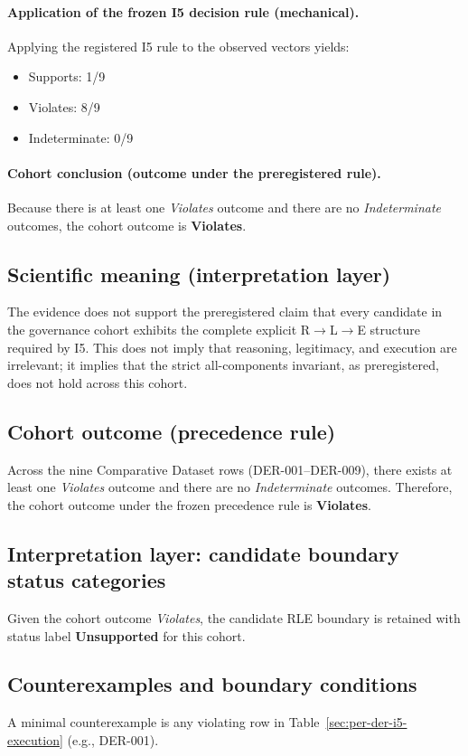 \paragraph{Application of the frozen I5 decision rule (mechanical).}
Applying the registered I5 rule to the observed vectors yields:
\begin{itemize}
  \item Supports: 1/9
  \item Violates: 8/9
  \item Indeterminate: 0/9
\end{itemize}

\paragraph{Cohort conclusion (outcome under the preregistered rule).}
Because there is at least one \emph{Violates} outcome and there are no \emph{Indeterminate} outcomes, the cohort outcome is \textbf{Violates}.

\subsection{Scientific meaning (interpretation layer)}
The evidence does not support the preregistered claim that every candidate in the governance cohort exhibits the complete explicit R$\rightarrow$L$\rightarrow$E structure required by I5. This does not imply that reasoning, legitimacy, and execution are irrelevant; it implies that the strict all-components invariant, as preregistered, does not hold across this cohort.

\subsection{Cohort outcome (precedence rule)}
Across the nine Comparative Dataset rows (DER-001--DER-009), there exists at least one \emph{Violates} outcome and there are no \emph{Indeterminate} outcomes. Therefore, the cohort outcome under the frozen precedence rule is \textbf{Violates}.

\subsection{Interpretation layer: candidate boundary status categories}
Given the cohort outcome \emph{Violates}, the candidate RLE boundary is retained with status label \textbf{Unsupported} for this cohort.

\subsection{Counterexamples and boundary conditions}
A minimal counterexample is any violating row in Table~\ref{sec:per-der-i5-execution} (e.g., DER-001).
